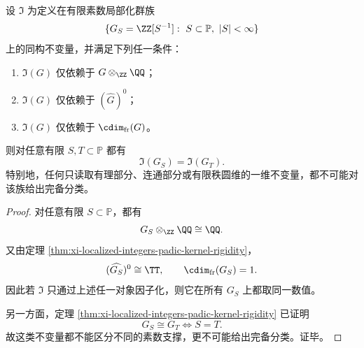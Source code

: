 \begin{theorem}[连通与有理不变量的统一不可区分性]\label{thm:xi-localized-integers-connected-rational-blindness}
设 \(\mathfrak I\) 为定义在有限素数局部化群族
\[
\{G_S=\ZZ[S^{-1}]:\ S\subset\mathbb P,\ |S|<\infty\}
\]
上的同构不变量，并满足下列任一条件：
\begin{enumerate}
  \item \(\mathfrak I(G)\) 仅依赖于 \(G\otimes_{\ZZ}\QQ\)；
  \item \(\mathfrak I(G)\) 仅依赖于 \((\widehat G)^0\)；
  \item \(\mathfrak I(G)\) 仅依赖于 \(\cdim_{\mathrm{fr}}(G)\)。
\end{enumerate}
则对任意有限 \(S,T\subset\mathbb P\) 都有
\[
\mathfrak I(G_S)=\mathfrak I(G_T).
\]
特别地，任何只读取有理部分、连通部分或有限秩圆维的一维不变量，都不可能对该族给出完备分类。
\end{theorem}
\begin{proof}
对任意有限 \(S\subset\mathbb P\)，都有
\[
G_S\otimes_{\ZZ}\QQ\cong \QQ.
\]
又由定理 \ref{thm:xi-localized-integers-padic-kernel-rigidity}，
\[
(\widehat{G_S})^0\cong \TT,
\qquad
\cdim_{\mathrm{fr}}(G_S)=1.
\]
因此若 \(\mathfrak I\) 只通过上述任一对象因子化，则它在所有 \(G_S\) 上都取同一数值。

另一方面，定理 \ref{thm:xi-localized-integers-padic-kernel-rigidity} 已证明
\[
G_S\cong G_T
\iff
S=T.
\]
故这类不变量都不能区分不同的素数支撑，更不可能给出完备分类。证毕。
\end{proof}



\endinput
